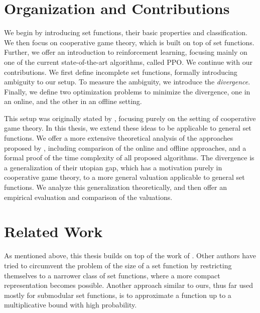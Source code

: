 \section*{Organization and Contributions}

We begin by introducing set functions, their basic properties and classification.
We then focus on cooperative game theory, which is built on top of set functions.
Further, we offer an introduction to reinforcement learning, focusing mainly on one of the current state-of-the-art algorithms, called PPO.
We continue with our contributions.
We first define incomplete set functions, formally introducing ambiguity to our setup.
To measure the ambiguity, we introduce the \emph{divergence}.
Finally, we define two optimization problems to minimize the divergence, one in an online, and the other in an offline setting.

This setup was originally stated by \cite{uradnik2024reducing}, focusing purely on the setting of cooperative game theory.
In this thesis, we extend these ideas to be applicable to general set functions.
We offer a more extensive theoretical analysis of the approaches proposed by \cite{uradnik2024reducing}, including comparison of the online and offline approaches, and a formal proof of the time complexity of all proposed algorithms.
The divergence is a generalization of their utopian gap, which has a motivation purely in cooperative game theory, to a more general valuation applicable to general set functions.
We analyze this generalization theoretically, and then offer an empirical evaluation and comparison of the valuations.

\section*{Related Work}

As mentioned above, this thesis builds on top of the work of \citep{uradnik2024reducing}.
Other  authors have tried to circumvent the problem of the size of a set function by restricting themselves to a narrower class of set functions, where a more compact representation becomes possible.
Another approach similar to ours, thus far used mostly for submodular set functions, is to approximate a function up to a multiplicative bound with high probability.

